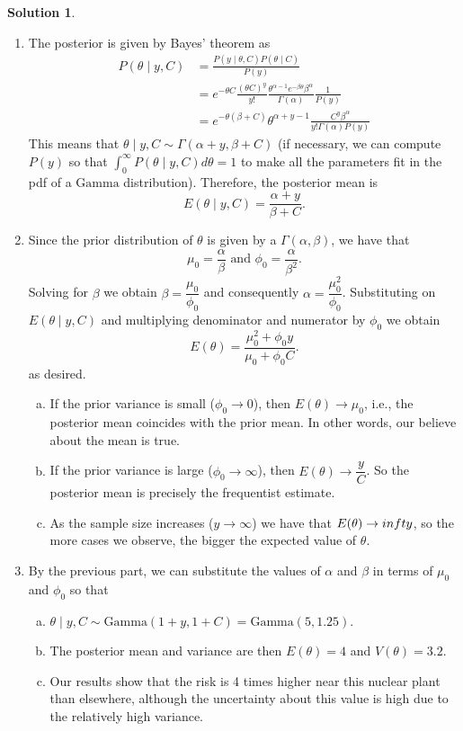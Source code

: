 \documentclass{article}
\theoremstyle{plain}
\theoremstyle{definition}
\newtheorem*{sol*}{Solution}
\begin{document}
\begin{sol*}\
\begin{enumerate}
\item The posterior is given by Bayes' theorem as
\begin{align*}
P(\theta\mid y, C)&	= \frac{P(y\mid\theta, C)P(\theta\mid C)}{P(y)}\\
&= e^{-\theta C} \frac{(\theta C)^y}{y!} \frac{ \theta^{\alpha-1} e^{-\beta \theta} \beta^\alpha}{\Gamma(\alpha)}\frac{1}{P(y)}\\
&=e^{-\theta (\beta + C)}\theta^{\alpha+y-1}\frac{C^y \beta^\alpha}{y! \Gamma(\alpha)P(y)} 
\end{align*}
This means that $\theta\mid y, C\sim\Gamma(\alpha+y, \beta+C)$ (if necessary, we can compute $P(y)$ so that $\int_0^{\infty}P(\theta\mid y, C)d\theta =1$ to make all the parameters fit in the pdf of a $\mathrm{Gamma}$ distribution). Therefore, the posterior mean is
\[E(\theta\mid y, C)=\frac{\alpha+y}{\beta+C}.\]
\item Since the prior distribution of $\theta$ is given by a $\Gamma(\alpha,\beta)$, we have that 
\[\mu_0 = \frac{\alpha}{\beta}\text{ and } \phi_0 = \frac{\alpha}{\beta^2}.\]
Solving for $\beta$ we obtain $\beta = \dfrac{\mu_0}{\phi_0}$ and consequently $\alpha = \dfrac{\mu_0^2}{\phi_0}$. Substituting on $E(\theta\mid y,C)$ and multiplying denominator and numerator by $\phi_0$ we obtain
\[
E(\theta) =\frac{\mu^2_0 + \phi_0y}{\mu_0 + \phi_0C}.
\]
as desired.
\begin{enumerate}[(a)]
\item If the prior variance is small ($\phi_0\to 0$), then $E(\theta)\to\mu_0$, i.e., the posterior mean coincides with the prior mean. In other words, our believe about the mean is true.
\item If the prior variance is large ($\phi_0\to\infty$), then $E(\theta)\to \dfrac{y}{C}$. So the posterior mean is precisely the frequentist estimate.
\item As the sample size increases ($y\to\infty$) we have that $E(\theta)\to\\infty$, so the more cases we observe, the bigger the expected value of $\theta$.
\end{enumerate}

\item By the previous part, we can substitute the values of $\alpha$ and $\beta$ in terms of $\mu_0$ and $\phi_0$ so that 
\begin{enumerate}[(a)]
\item $\theta\mid y, C\sim\mathrm{Gamma}(1+y,1+C)=\mathrm{Gamma}(5, 1.25)$.
\item The posterior mean and variance are then $E(\theta)=4$ and $V(\theta)=3.2$.
\item Our results show that the risk is 4 times higher near this nuclear plant than elsewhere, although the uncertainty about this value is high due to the relatively high variance.
\end{enumerate}

\end{enumerate}
\end{sol*}
\end{document}
